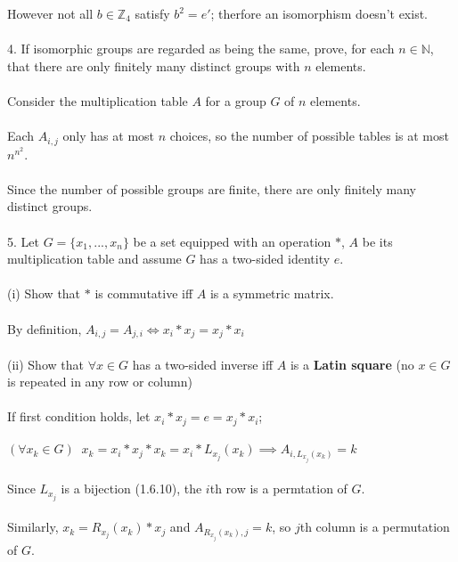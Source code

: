 \documentclass{article}
\begin{document}
\begin{siderules}
\null\qquad However not all \(b\in\mathbb{Z}_4\) satisfy \(b^2=e'\); therfore an isomorphism doesn't exist.\\\\
\color{blue} 4. If isomorphic groups are regarded as being the same, prove, for each \(n\in\mathbb{N}\), that there are only finitely many distinct groups with \(n\) elements.\color{black}\\\\
\null\qquad Consider the multiplication table \(A\) for a group \(G\) of \(n\) elements.\\\\
\null\qquad Each \(A_{i,j}\) only has at most \(n\) choices, so the number of possible tables is at most \(n^{n^2}\).\\\\
\null\qquad Since the number of possible groups are finite, there are only finitely many distinct groups.\\\\
\color{blue} 5. Let \(G=\{x_1,...,x_n\}\) be a set equipped with an operation \(*\), \(A\) be its multiplication table and assume \(G\) has a two-sided identity \(e\).\color{black}\\\\
\color{blue} (i) Show that \(*\) is commutative iff \(A\) is a symmetric matrix.\color{black}\\\\
\null\qquad By definition, \(A_{i,j}=A_{j,i}\iff x_i*x_j=x_j*x_i\)\\\\
\color{blue} (ii) Show that \(\forall x\in G\) has a two-sided inverse iff \(A\) is a \textbf{Latin square} (no \(x\in G\) is repeated in any row or column)\color{black}\\\\
\null\qquad If first condition holds, let \(x_i*x_j=e=x_j*x_i\);\\\\
\null\qquad \((\forall x_k\in G)\;\;x_k=x_i*x_j*x_k=x_i*L_{x_j}(x_k)\implies A_{i,L_{x_j}(x_k)}=k\)\\\\
\null\qquad Since \(L_{x_j}\) is a bijection \color{gray} (1.6.10)\color{black}, the \(i\)th row is a permtation of \(G\).\\\\
\null\qquad Similarly, \(x_k=R_{x_j}(x_k)*x_j\) and \(A_{R_{x_j}(x_k),j}=k\), so \(j\)th column is a permutation of \(G\).\\\\

\end{siderules}
\end{document}
